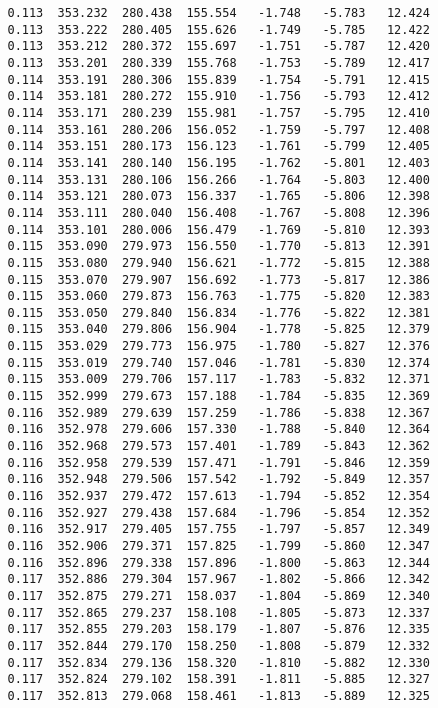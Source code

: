 \begin{verbatim}
   0.113  353.232  280.438  155.554   -1.748   -5.783   12.424
   0.113  353.222  280.405  155.626   -1.749   -5.785   12.422
   0.113  353.212  280.372  155.697   -1.751   -5.787   12.420
   0.113  353.201  280.339  155.768   -1.753   -5.789   12.417
   0.114  353.191  280.306  155.839   -1.754   -5.791   12.415
   0.114  353.181  280.272  155.910   -1.756   -5.793   12.412
   0.114  353.171  280.239  155.981   -1.757   -5.795   12.410
   0.114  353.161  280.206  156.052   -1.759   -5.797   12.408
   0.114  353.151  280.173  156.123   -1.761   -5.799   12.405
   0.114  353.141  280.140  156.195   -1.762   -5.801   12.403
   0.114  353.131  280.106  156.266   -1.764   -5.803   12.400
   0.114  353.121  280.073  156.337   -1.765   -5.806   12.398
   0.114  353.111  280.040  156.408   -1.767   -5.808   12.396
   0.114  353.101  280.006  156.479   -1.769   -5.810   12.393
   0.115  353.090  279.973  156.550   -1.770   -5.813   12.391
   0.115  353.080  279.940  156.621   -1.772   -5.815   12.388
   0.115  353.070  279.907  156.692   -1.773   -5.817   12.386
   0.115  353.060  279.873  156.763   -1.775   -5.820   12.383
   0.115  353.050  279.840  156.834   -1.776   -5.822   12.381
   0.115  353.040  279.806  156.904   -1.778   -5.825   12.379
   0.115  353.029  279.773  156.975   -1.780   -5.827   12.376
   0.115  353.019  279.740  157.046   -1.781   -5.830   12.374
   0.115  353.009  279.706  157.117   -1.783   -5.832   12.371
   0.115  352.999  279.673  157.188   -1.784   -5.835   12.369
   0.116  352.989  279.639  157.259   -1.786   -5.838   12.367
   0.116  352.978  279.606  157.330   -1.788   -5.840   12.364
   0.116  352.968  279.573  157.401   -1.789   -5.843   12.362
   0.116  352.958  279.539  157.471   -1.791   -5.846   12.359
   0.116  352.948  279.506  157.542   -1.792   -5.849   12.357
   0.116  352.937  279.472  157.613   -1.794   -5.852   12.354
   0.116  352.927  279.438  157.684   -1.796   -5.854   12.352
   0.116  352.917  279.405  157.755   -1.797   -5.857   12.349
   0.116  352.906  279.371  157.825   -1.799   -5.860   12.347
   0.116  352.896  279.338  157.896   -1.800   -5.863   12.344
   0.117  352.886  279.304  157.967   -1.802   -5.866   12.342
   0.117  352.875  279.271  158.037   -1.804   -5.869   12.340
   0.117  352.865  279.237  158.108   -1.805   -5.873   12.337
   0.117  352.855  279.203  158.179   -1.807   -5.876   12.335
   0.117  352.844  279.170  158.250   -1.808   -5.879   12.332
   0.117  352.834  279.136  158.320   -1.810   -5.882   12.330
   0.117  352.824  279.102  158.391   -1.811   -5.885   12.327
   0.117  352.813  279.068  158.461   -1.813   -5.889   12.325

\end{verbatim}
